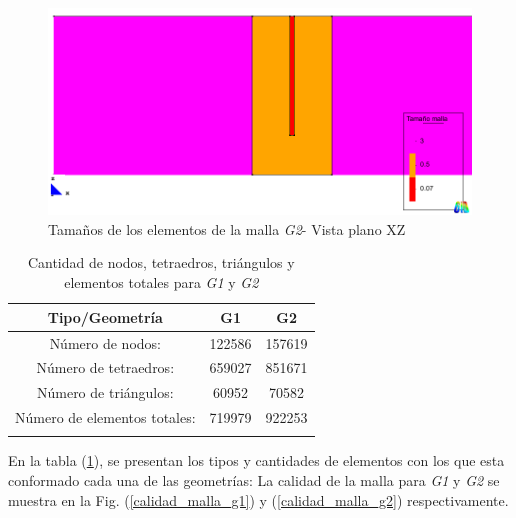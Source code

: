 \documentclass[10pt,a4paper,final]{article}
\begin{document}
%
\begin{figure}[tbhp]
\centerline{\includegraphics[scale=0.4]{img/200m/200_xz_tam_malla}}
\caption{Tamaños de los elementos de la malla \emph{G2}- Vista plano XZ}
\label{200_xz_tam_malla}
\end{figure}
%
%
\begin{table}[tbhp]
\begin{center}\begin{tabular}{ccc}
\hline \textbf{Tipo/Geometría} & \textbf{G1} & \textbf{G2} \\ 
\hline Número de nodos: & 122586 & 157619 \\ 
\hline Número de tetraedros: & 659027 & 851671\\ 
\hline Número de triángulos: & 60952  & 70582 \\ 
\hline Número de elementos totales: & 719979 & 922253 \\ 
\hline 
\label{tabla_lista_elementos}
\end{tabular}\end{center}
\caption{Cantidad de nodos, tetraedros, triángulos y elementos totales para \emph{G1} y \emph{G2}}
\end{table}
%
En la tabla (\ref{tabla_lista_elementos}), se presentan los tipos y cantidades de elementos con los que esta conformado cada una de las geometrías:
%
La calidad de la malla para \emph{G1} y \emph{G2} se muestra en la Fig. (\ref{calidad_malla_g1}) y (\ref{calidad_malla_g2}) respectivamente.
%
\end{document}
